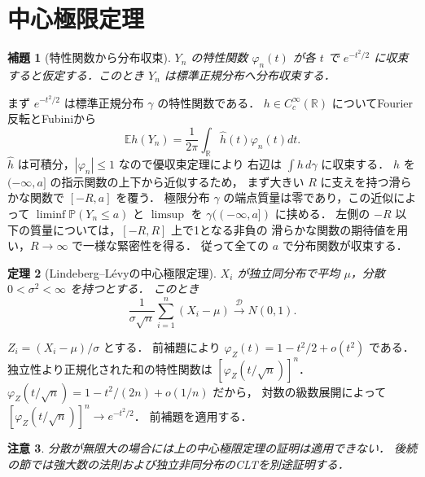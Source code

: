 \documentclass[a5paper,10pt,onecolumn]{jsarticle}
\makeatletter
\theoremstyle{mathnotetheorem}
\newtheorem{theorem}{定理}[section]
\newtheorem{lemma}[theorem]{補題}
\newtheorem{remark}[theorem]{注意}
\renewcommand{\proofname}{証明}
\renewenvironment{proof}[1][\proofname]{%
  \par\pushQED{\qed}\normalfont\topsep4\p@\@plus2\p@\relax
  \trivlist\item[\hskip\labelsep\bfseries #1]\ignorespaces
}{\popQED\endtrivlist\@endpefalse}
\makeatother
\begin{document}
\section{中心極限定理}
\begin{lemma}[特性関数から分布収束]
$Y_n$ の特性関数 $\varphi_n(t)$ が各 $t$ で
$e^{-t^2/2}$ に収束すると仮定する．このとき $Y_n$ は標準正規分布へ分布収束する．
\end{lemma}
\begin{proof}
まず $e^{-t^2/2}$ は標準正規分布 $\gamma$ の特性関数である．
$h\in C_c^\infty(\mathbb R)$ についてFourier反転とFubiniから
\[
 \mathbb E h(Y_n)=\frac1{2\pi}\int_\mathbb R\widehat h(t)\varphi_n(t)dt.
\]
$\widehat h$ は可積分，$|\varphi_n|\le1$ なので優収束定理により
右辺は $\int h\,d\gamma$ に収束する．
$h$ を $(-\infty,a]$ の指示関数の上下から近似するため，
まず大きい $R$ に支えを持つ滑らかな関数で $[-R,a]$ を覆う．
極限分布 $\gamma$ の端点質量は零であり，この近似によって
$\liminf\mathbb P(Y_n\le a)$ と $\limsup$ を
$\gamma(( -\infty,a])$ に挟める．
左側の $-R$ 以下の質量については，$[-R,R]$ 上で1となる非負の
滑らかな関数の期待値を用い，$R\to\infty$ で一様な緊密性を得る．
従って全ての $a$ で分布関数が収束する．
\end{proof}
\begin{theorem}[Lindeberg--L\'evyの中心極限定理]
$X_i$ が独立同分布で平均 $\mu$，分散 $0<\sigma^2<\infty$ を持つとする．
このとき
\[
 \frac1{\sigma\sqrt n}\sum_{i=1}^n(X_i-\mu)
 \xrightarrow{\mathcal D}N(0,1).
\]
\end{theorem}
\begin{proof}
$Z_i=(X_i-\mu)/\sigma$ とする．
前補題により $\varphi_Z(t)=1-t^2/2+o(t^2)$ である．
独立性より正規化された和の特性関数は
$[\varphi_Z(t/\sqrt n)]^n$．
$\varphi_Z(t/\sqrt n)=1-t^2/(2n)+o(1/n)$ だから，
対数の級数展開によって
$[\varphi_Z(t/\sqrt n)]^n\to e^{-t^2/2}$．
前補題を適用する．
\end{proof}
\begin{remark}
分散が無限大の場合には上の中心極限定理の証明は適用できない．
後続の節では強大数の法則および独立非同分布のCLTを別途証明する．
\end{remark}
\end{document}
